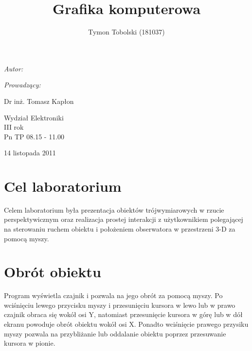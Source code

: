 \documentclass[wide,a4paper,titlepage,12pt] {article}
\title{Grafika komputerowa}
\author{Tymon Tobolski (181037)}
\makeatletter
\renewcommand{\maketitle}{
\begin{titlepage}
  \begin{center}
    \vspace*{3cm}
    \LARGE \@title \par
    \vspace{2cm}
    \textit{\small Autor:}\par
    \normalsize \@author\par \normalsize
    \vspace{3cm}
    \textit{\small Prowadzący:}\par
    Dr inż. Tomasz Kapłon \par
    \vspace{2cm}
    Wydział Elektroniki\\ III rok\\ Pn TP 08.15 - 11.00\par
    \vspace{4cm}
    \small 14 listopada 2011
  \end{center}
\end{titlepage}
}
\makeatother
\begin{document}
\maketitle
  \section{Cel laboratorium}
  \paragraph{}
  Celem laboratorium była prezentacja obiektów trójwymiarowych w rzucie perspektywicznym oraz realizacja prostej interakcji z użytkownikiem polegającej na sterowaniu ruchem obiektu i położeniem obserwatora w przestrzeni 3-D za pomocą myszy.

  \section{Obrót obiektu}
  \paragraph{}
  Program wyświetla czajnik i pozwala na jego obrót za pomocą myszy. Po wciśnięciu lewego przycisku myszy i przesunięciu kursora w lewo lub w prawo czajnik obraca się wokół osi Y, natomiast przesunięcie kursora w górę lub w dół ekranu powoduje obrót obiektu wokół osi X. Ponadto wciśnięcie prawego przysiku myszy pozwala na przybliżanie lub oddalanie obiektu poprzez przesuwanie kursora w pionie.

  \paragraph{}
  
\end{document}
